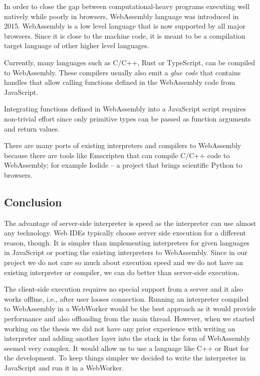 In order to close the gap between computational-heavy programs executing well natively while poorly in browsers, WebAssembly
language was introduced in 2015. WebAssembly is a low level language that is now supported by all major browsers. Since it is
close to the machine code, it is meant to be a compilation target language of other higher level languages.

Currently, many languages such as C/C++, Rust or TypeScript, can be compiled to WebAssembly. These compilers usually also emit
a \emph{glue code} that contains handles that allow calling functions defined in the WebAssembly code from JavaScript.

Integrating functions defined in WebAssembly into a JavaScript script requires non-trivial effort since only primitive types can be passed
as function arguments and return values.

There are many ports of existing interpreters and compilers to WebAssembly because there are tools like Emscripten \cite{Emscripten}
that can compile C/C++ code to WebAssembly; for example Iodide \cite{Iodide} -- a project that brings scientific Python
to browsers.

\subsection{Conclusion}
The advantage of server-side interpreter is speed as the interpreter can use almost any technology. Web IDEs typically choose
server side execution for a different reason, though. It is simpler than implementing interpreters for given languages in JavaScript or
porting the existing interpreters to WebAssembly. Since in our project we do not care so much about execution speed and
we do not have an existing interpreter or compiler, we can do better than server-side execution.

The client-side execution requires no special support from a server and it also works offline, i.e., after user looses connection. Running an interpreter
compiled to WebAssembly in a WebWorker would be the best approach as it would provide performance and also offloading from the main thread.
However, when we started working on the thesis we did not have any prior experience with writing an interpreter and adding another layer into the stack in the
form of WebAssembly seemed very complex. It would allow us to use a language like C++ or Rust for the development. To keep things simpler we
decided to write the interpreter in JavaScript and run it in a WebWorker.

